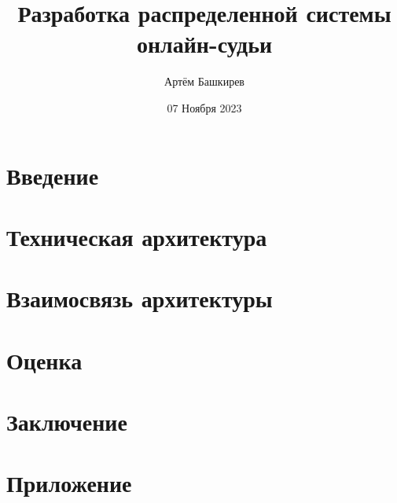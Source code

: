 \documentclass[12pt]{article}
\title{Разработка распределенной системы онлайн-судьи}
\author{Артём Башкирев}
\date{07 Ноября 2023}
\begin{document}
\maketitle
\thispagestyle{empty}

\newpage
    \tableofcontents
\newpage


    \section{Введение}
    
\newpage

    \section{Техническая архитектура}
    
\newpage

    \section{Взаимосвязь архитектуры}
    
\newpage

    \section{Оценка}
    
\newpage

    \section{Заключение}
    
\newpage

    \section{Приложение}
    
\end{document}
